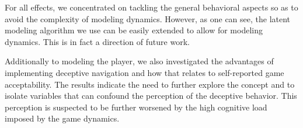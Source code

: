 For all effects, we concentrated on tackling the general behavioral aspects so as to avoid the complexity of modeling dynamics. However, as one can see, the latent modeling algorithm we use can be easily extended to allow for modeling dynamics. This is in fact a direction of future work.

Additionally to modeling the player, we also investigated the advantages of implementing deceptive navigation and how that relates to self-reported game acceptability. The results indicate the need to further explore the concept and to isolate variables that can confound the perception of the deceptive behavior. This perception is suspected to be further worsened by the high cognitive load imposed by the game dynamics.